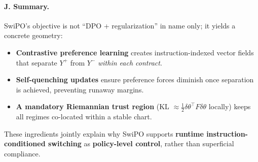 \paragraph{\textbf{J. Summary.}}
SwiPO's objective is not ``DPO + regularization'' in name only; it yields a concrete geometry:
\begin{itemize}
\item \textbf{Contrastive preference learning} creates instruction-indexed vector fields that separate $Y^+$ from $Y^-$ \emph{within each contract}.
\item \textbf{Self-quenching updates} ensure preference forces diminish once separation is achieved, preventing runaway margins.
\item \textbf{A mandatory Riemannian trust region} (KL $\approx \tfrac12\delta\theta^\top F\delta\theta$ locally) keeps all regimes co-located within a stable chart.
\end{itemize}
These ingredients jointly explain why SwiPO supports \textbf{runtime instruction-conditioned switching} as \textbf{policy-level control}, rather than superficial compliance.
